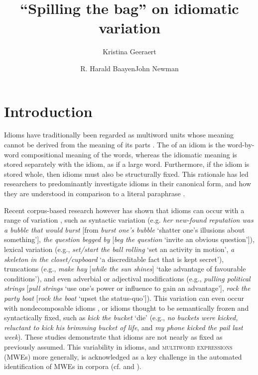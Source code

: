 \documentclass[output=paper,modfonts,nonflat]{langsci/langscibook}
\title{``Spilling the bag'' on idiomatic variation}
\author{ Kristina Geeraert\affiliation{KU Leuven}\and  R. Harald Baayen\affiliation{University of T\"ubingen \& University of Alberta}\lastand  John Newman\affiliation{University of Alberta \& Monash University}}
\begin{document}
\maketitle
\label{GEERAERT-CHAPTER}

\section{Introduction} 


Idioms have traditionally been regarded as multiword units whose meaning cannot be derived from the meaning of its parts \citep{BobrowBell1973}. The  of an idiom is the word-by-word compositional meaning of the words, whereas the idiomatic meaning is stored separately with the idiom, as if a large word. Furthermore, if the idiom is stored whole, then idioms must also be structurally fixed. This rationale has led researchers to predominantly investigate idioms in their canonical form, and how they are understood in comparison to a literal paraphrase \citep{SwinneyCutler1979, Gibbs1980, CacciariTabossi1988, TitoneConnine1999}.

Recent corpus-based research however has shown that idioms can occur with a range of variation \citep{Moon1998, Barlow2000, Langlotz2006, Schroder2013}, such as syntactic variation (e.g. \textit{her new-found reputation was a bubble that would burst} [from \textit{burst one's bubble} `shatter one's illusions about something'], \textit{the question begged by} [\textit{beg the question} `invite an obvious question']), lexical variation (e.g., \textit{set/start the ball rolling} `set an activity in motion', \textit{a skeleton in the closet/cupboard} `a discreditable fact that is kept secret'), truncations (e.g., \textit{make hay} [\textit{while the sun shines}] `take advantage of favourable conditions'), and even adverbial or adjectival modifications (e.g., \textit{pulling political strings} [\textit{pull strings} `use one's power or influence to gain an advantage'], \textit{rock the party boat} [\textit{rock the boat} `upset the status-quo']). This variation can even occur with nondecomposable idioms \citep{Duffley2013}, or idioms thought to be semantically frozen and syntactically fixed, such as \textit{kick the bucket} `die' (e.g., \textit{no buckets were kicked, reluctant to kick his brimming bucket of life}, and \textit{my phone kicked the pail last week}). These studies demonstrate that idioms are not nearly as fixed as previously assumed. This variability in idioms, and \textsc{multiword expressions} (MWEs) more generally, is acknowledged as a key challenge in the automated identification of MWEs in corpora (cf.   and  ).
\end{document}
